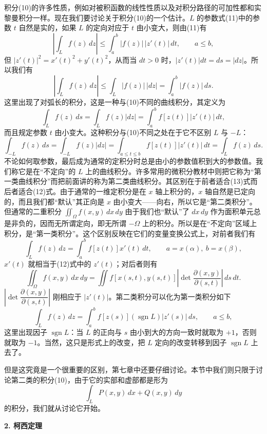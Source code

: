 积分(10)的许多性质，例如对被积函数的线性性质以及对积分路径的可加性都和实黎曼积分一样。现在我们要讨论关于积分(10)的一个估计。$L$ 的参数式(11)中的参数 $t$ 自然是实的，如果 $L$ 的定向对应于 $t$ 由小变大，则由(11)有
\[
 \left|\int_Lf(z)\,dz\right|
 \le\int_a^b|f(z)|\,|z'(t)|\,dt,\qquad a\le b,
\]
但 $|z'(t)|^2=x'(t)^2+y'(t)^2$，从而当 $dt>0$ 时，$|z'(t)|dt=ds=|dz|$。所以我们有
\[
 \left|\int_Lf(z)\,dz\right|
 \le\int_L|f(z)|\,|dz|
 =\int_a^b|f(z)|\,ds.
\]
这里出现了对弧长的积分，这是一种与(10)不同的曲线积分，其定义为
\[
 \int_Lf(z)\,ds=\int_Lf(z)|dz|=\int_a^b f[z(t)]|z'(t)|\,dt,
\]
而且规定参数 $t$ 由小变大。这种积分与(10)不同之处在于它不区别 $L$ 与 $-L$：
\begin{equation}
 \int_{-L}f(z)\,ds
 =\int_{-L}f(z)|dz|
 =\int_{a\le t\le b}f[z(t)]|z'(t)|\,dt
 =\int_Lf(z)\,ds.
 \tag{13}
\end{equation}
不论如何取参数，最后成为通常的定积分时总是由小的参数值积到大的参数值。我们称它是在“不定向”的 $L$ 上的曲线积分。许多常用的微积分教材中则把它称为“第一类曲线积分”而把前面讲的称为第二类曲线积分。其区别在于前者适合(13)式而后者适合(12)式。由于通常的一维定积分是在 $x$ 轴上积分的，$x$ 轴自然是已定向的，而且我们都“默认”其正向是 $x$ 由小变大——向右，所以它是“第二类积分”。但通常的二重积分 $\iint_\Omega f(x,y)\,dx\,dy$ 由于我们也“默认”了 $dx\,dy$ 作为面积单元总是非负的，因而无所谓定向，即无所谓 $-\Omega$ 上的积分。所以是在“不定向”区域上积分，是“第一类积分”。这个区别反映在它们的变量变换公式上，对前者我们有
\[
 \int_Lf(z)\,dz=\int_a^b f[z(t)]x'(t)\,dt,\qquad a=x(\alpha),\ b=x(\beta),
\]
$x'(t)$ 就相当于(12)式中的 $z'(t)$；对后者则有
\[
 \iint_\Omega f(x,y)\,dx\,dy
 =\iint f[x(s,t),y(s,t)]
 \left|\det\frac{\partial(x,y)}{\partial(s,t)}\right|\,ds\,dt.
\]
$\left|\det\dfrac{\partial(x,y)}{\partial(s,t)}\right|$ 刚相应于 $|z'(t)|$。第二类积分可以化为第一类积分如下
\[
 \int_Lf(z)\,dz=\int_a^b f[z(s)](\operatorname{sgn}L)|z'(s)|\,ds,\qquad a\le b,
\]
这里出现因子 $\operatorname{sgn}L$：当 $L$ 的正向与 $s$ 由小到大的方向一致时就取为 $+1$，否则就取为 $-1$。当然，这只是形式上的改变，把 $L$ 定向的改变转移到因子 $\operatorname{sgn}L$ 上去了。

但是这究竟是一个很重要的区别，第七章中还要仔细讨论。本节中我们则只限于讨论第二类的积分(10)，由于它的实部和虚部都是形为
\begin{equation}
 \int_LP(x,y)\,dx+Q(x,y)\,dy
 \tag{14}
\end{equation}
的积分，我们就从讨论它开始。

\medskip
\noindent\textbf{2. 柯西定理}

